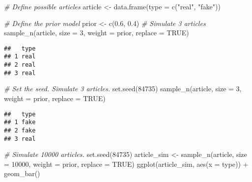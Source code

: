 \documentclass[
]{article}
\newenvironment{Shaded}{\begin{snugshade}}{\end{snugshade}}
\newcommand{\AttributeTok}[1]{\textcolor[rgb]{0.77,0.63,0.00}{#1}}
\newcommand{\CommentTok}[1]{\textcolor[rgb]{0.56,0.35,0.01}{\textit{#1}}}
\newcommand{\ConstantTok}[1]{\textcolor[rgb]{0.00,0.00,0.00}{#1}}
\newcommand{\DecValTok}[1]{\textcolor[rgb]{0.00,0.00,0.81}{#1}}
\newcommand{\FloatTok}[1]{\textcolor[rgb]{0.00,0.00,0.81}{#1}}
\newcommand{\FunctionTok}[1]{\textcolor[rgb]{0.00,0.00,0.00}{#1}}
\newcommand{\NormalTok}[1]{#1}
\newcommand{\OtherTok}[1]{\textcolor[rgb]{0.56,0.35,0.01}{#1}}
\newcommand{\SpecialCharTok}[1]{\textcolor[rgb]{0.00,0.00,0.00}{#1}}
\newcommand{\StringTok}[1]{\textcolor[rgb]{0.31,0.60,0.02}{#1}}
\begin{document}
\begin{Shaded}
\begin{Highlighting}[]
\CommentTok{\# Define possible articles}
\NormalTok{article }\OtherTok{\textless{}{-}} \FunctionTok{data.frame}\NormalTok{(}\AttributeTok{type =} \FunctionTok{c}\NormalTok{(}\StringTok{"real"}\NormalTok{, }\StringTok{"fake"}\NormalTok{))}

\CommentTok{\# Define the prior model}
\NormalTok{prior }\OtherTok{\textless{}{-}} \FunctionTok{c}\NormalTok{(}\FloatTok{0.6}\NormalTok{, }\FloatTok{0.4}\NormalTok{)}
\CommentTok{\# Simulate 3 articles}
\FunctionTok{sample\_n}\NormalTok{(article, }\AttributeTok{size =} \DecValTok{3}\NormalTok{, }\AttributeTok{weight =}\NormalTok{ prior, }\AttributeTok{replace =} \ConstantTok{TRUE}\NormalTok{)}
\end{Highlighting}
\end{Shaded}

\begin{verbatim}
##   type
## 1 real
## 2 real
## 3 real
\end{verbatim}

\begin{Shaded}
\begin{Highlighting}[]
\CommentTok{\# Set the seed. Simulate 3 articles.}
\FunctionTok{set.seed}\NormalTok{(}\DecValTok{84735}\NormalTok{)}
\FunctionTok{sample\_n}\NormalTok{(article, }\AttributeTok{size =} \DecValTok{3}\NormalTok{, }\AttributeTok{weight =}\NormalTok{ prior, }\AttributeTok{replace =} \ConstantTok{TRUE}\NormalTok{)}
\end{Highlighting}
\end{Shaded}

\begin{verbatim}
##   type
## 1 fake
## 2 fake
## 3 real
\end{verbatim}

\begin{Shaded}
\begin{Highlighting}[]
\CommentTok{\# Simulate 10000 articles. }
\FunctionTok{set.seed}\NormalTok{(}\DecValTok{84735}\NormalTok{)}
\NormalTok{article\_sim }\OtherTok{\textless{}{-}} \FunctionTok{sample\_n}\NormalTok{(article, }\AttributeTok{size =} \DecValTok{10000}\NormalTok{, }\AttributeTok{weight =}\NormalTok{ prior, }\AttributeTok{replace =} \ConstantTok{TRUE}\NormalTok{)}
\FunctionTok{ggplot}\NormalTok{(article\_sim, }\FunctionTok{aes}\NormalTok{(}\AttributeTok{x =}\NormalTok{ type)) }\SpecialCharTok{+} \FunctionTok{geom\_bar}\NormalTok{()}
\end{Highlighting}
\end{Shaded}
\end{document}
